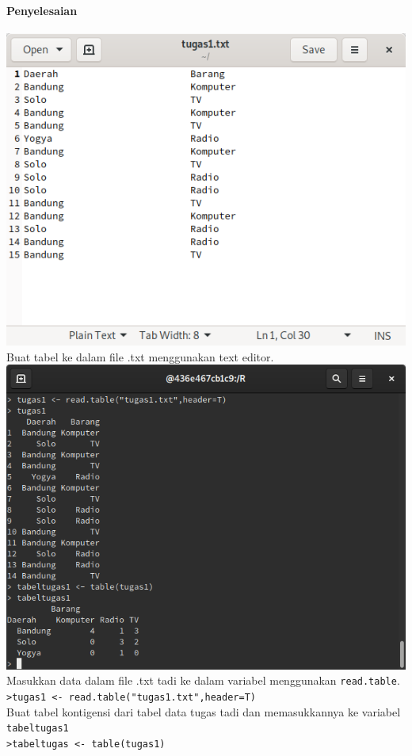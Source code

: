 \documentclass[a4paper,12pt]{article}
\begin{document}
\paragraph{Penyelesaian\\}
\includegraphics[width=\linewidth]{tugas1txt}
Buat tabel ke dalam file .txt menggunakan text editor.\\
\includegraphics[width=\linewidth]{tugas1output}
Masukkan data dalam file .txt tadi ke dalam variabel menggunakan \texttt{read.table}.\\
\texttt{>tugas1 <- read.table("tugas1.txt",header=T)}\\
Buat tabel kontigensi dari tabel data tugas tadi dan memasukkannya ke variabel \texttt{tabeltugas1}\\
\texttt{>tabeltugas <- table(tugas1)}
\end{document}
